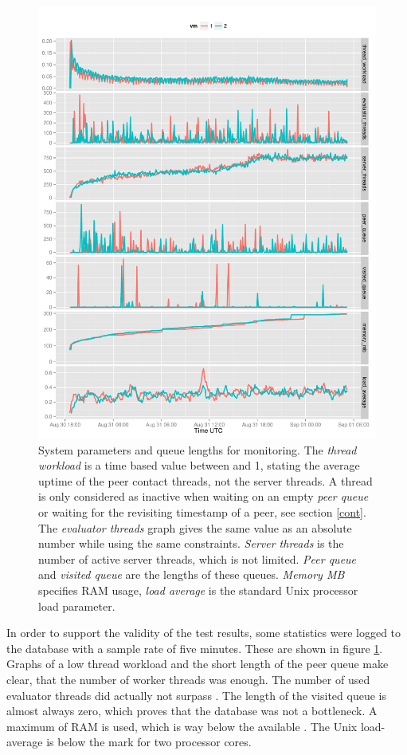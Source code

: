 \documentclass[10pt, a4paper, twoside=false, headsepline]{scrbook}
\renewcommand{\_}{\origunderscore\allowbreak}
\begin{document}
\begin{figure}
\centering
\includegraphics[width=\textwidth]{../result/2015-08-30_20-combined_workload}
\caption[Monitoring parameters during the analysis]{System parameters and queue lengths for monitoring. The \emph{thread workload} is a time based value between  and {1}, stating the average uptime of the peer contact threads, not the server threads. A thread is only considered as inactive when waiting on an empty \emph{peer queue} or waiting for the revisiting timestamp of a peer, see section \ref{cont}. The \emph{evaluator threads} graph gives the same value as an absolute number while using the same constraints. \emph{Server threads} is the number of active server threads, which is not limited. \emph{Peer queue} and \emph{visited queue} are the lengths of these queues. \emph{Memory MB} specifies RAM usage, \emph{load average} is the standard Unix processor load parameter.}
\label{workload}
\end{figure}

In order to support the validity of the test results, some statistics were logged to the database with a sample rate of five minutes. These are shown in figure \ref{workload}. Graphs of a low thread workload and the short length of the peer queue make clear, that the number of  worker threads was enough. The number of used evaluator threads did actually not surpass . The length of the visited queue is almost always zero, which proves that the database was not a bottleneck. A maximum of  RAM is used, which is way below the available . The Unix load-average is below the  mark for two processor cores.
\end{document}
